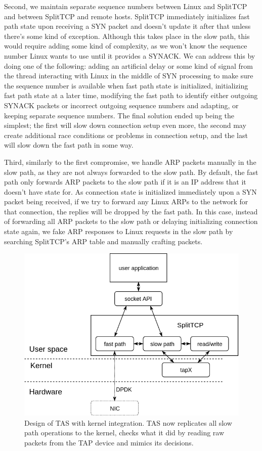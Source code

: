 Second, we maintain separate sequence numbers between Linux and SplitTCP and 
between SplitTCP and remote hosts. SplitTCP immediately initializes fast path 
state upon receiving a SYN packet and doesn't update it after that unless 
there's some kind of exception. Although this takes place in the slow path,
this would require adding some kind of complexity, as we won't know the sequence
number Linux wants to use until it provides a SYNACK. We can address this by 
doing one of the following: adding an artificial delay or some kind of signal 
from the thread interacting with Linux in the middle of SYN processing to make 
sure the sequence number is available when fast path state is initialized, 
initializing fast path state at a later time, modifying the fast path to 
identify either outgoing SYNACK packets or incorrect outgoing sequence numbers
and adapting, or keeping separate sequence numbers. The final solution ended up 
being the simplest; the first will slow down connection setup even more, the 
second may create additional race conditions or problems in connection setup, 
and the last will slow down the fast path in some way.

Third, similarly to the first compromise, we handle ARP packets manually in 
the slow path, as they are not always forwarded to the slow path. By default,
the fast path only forwards ARP packets to the slow path if it is an IP address
that it doesn't have state for. As connection state is initialized immediately 
upon a SYN packet being received, if we try to forward any Linux ARPs to the 
network for that connection, the replies will be dropped by the fast path. In
this case, instead of forwarding all ARP packets to the slow path or delaying
initializing connection state again, we fake ARP responses to Linux requests 
in the slow path by searching SplitTCP's ARP table and manually crafting 
packets. 

\begin{figure}
\centering
\includegraphics[width=0.7\columnwidth]{figures/splittcp.png}
\caption{Design of TAS with kernel integration. TAS now replicates all slow path operations to the kernel, checks what
it did by reading raw packets from the TAP device and mimics its decisions.}
\label{fig:splittcp_tap}
\end{figure}